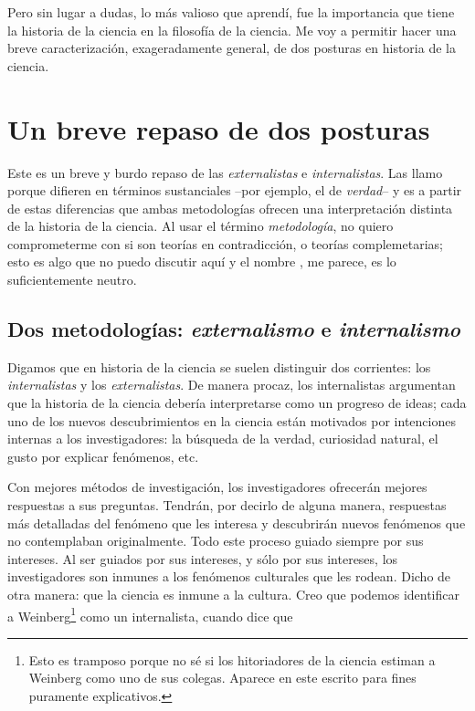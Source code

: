 Pero sin lugar a dudas, lo más valioso que aprendí, fue la importancia que tiene la historia de la ciencia en la filosofía de la ciencia.
Me voy a permitir hacer una breve caracterización, exageradamente general, de dos posturas en historia de la ciencia.


\section{Un breve repaso de dos posturas}

\noindent Este es un breve y burdo repaso de las  \emph{externalistas} e \emph{internalistas}.
Las llamo  porque difieren en términos sustanciales --por ejemplo, el de \emph{verdad}-- y es a partir de estas diferencias que ambas metodologías ofrecen una interpretación distinta de la historia de la ciencia.
Al usar el término \emph{metodología}, no quiero comprometerme con si son teorías en contradicción, o teorías complemetarias; esto es algo que no puedo discutir aquí y el nombre , me parece, es lo suficientemente neutro.


\subsection{Dos metodologías: \emph{externalismo} e \emph{internalismo}}

\noindent Digamos que en historia de la ciencia se suelen distinguir dos corrientes: los \emph{internalistas} y los \emph{externalistas}.
De manera procaz, los internalistas argumentan que la historia de la ciencia debería interpretarse como un progreso de ideas; cada uno de los nuevos descubrimientos en la ciencia están motivados por intenciones internas a los investigadores: la búsqueda de la verdad, curiosidad natural, el gusto por explicar fenómenos, etc.

Con mejores métodos de investigación, los investigadores ofrecerán mejores respuestas a sus preguntas.
Tendrán, por decirlo de alguna manera, respuestas más detalladas del fenómeno que les interesa y descubrirán nuevos fenómenos que no contemplaban originalmente.
Todo este proceso guiado siempre por sus intereses.
Al ser guiados por sus intereses, y sólo por sus intereses, los investigadores son inmunes a los fenómenos culturales que les rodean.
Dicho de otra manera: que la ciencia es inmune a la cultura.
Creo que podemos identificar a Weinberg\footnote{
	Esto es tramposo porque no sé si los hitoriadores de la ciencia estiman a Weinberg como uno de sus colegas.
	Aparece en este escrito para fines puramente explicativos.} como un internalista, cuando dice que

